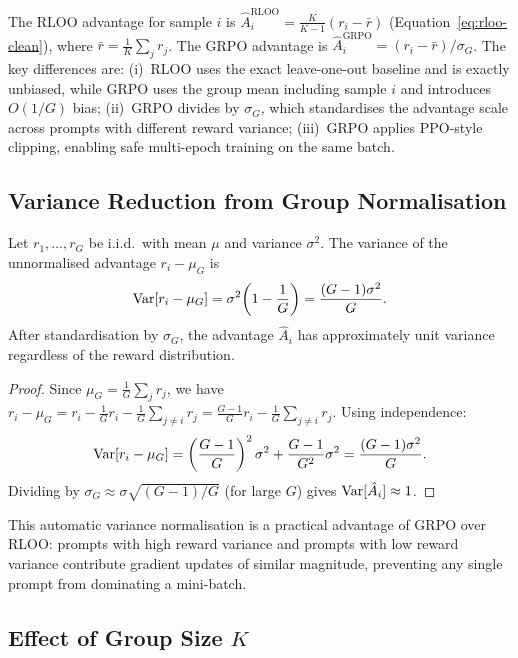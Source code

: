 The RLOO advantage for sample $i$ is $\hat{A}_i^{\mathrm{RLOO}} = \frac{K}{K-1}(r_i - \bar{r})$ (Equation~\eqref{eq:rloo-clean}), where $\bar{r} = \frac{1}{K}\sum_j r_j$.  The GRPO advantage is $\hat{A}_i^{\mathrm{GRPO}} = (r_i - \bar{r}) / \sigma_G$.  The key differences are: (i)~RLOO uses the exact leave-one-out baseline and is exactly unbiased, while GRPO uses the group mean including sample $i$ and introduces $O(1/G)$ bias; (ii)~GRPO divides by $\sigma_G$, which standardises the advantage scale across prompts with different reward variance; (iii)~GRPO applies PPO-style clipping, enabling safe multi-epoch training on the same batch.

\subsection{Variance Reduction from Group Normalisation}

\begin{proposition}
\label{prop:grpo-variance}
Let $r_1, \ldots, r_G$ be i.i.d.\ with mean $\mu$ and variance $\sigma^2$.  The variance of the unnormalised advantage $r_i - \mu_G$ is
\begin{equation}
\label{eq:grpo-var-unnorm}
\operatorname{Var}[r_i - \mu_G] = \sigma^2\!\left(1 - \frac{1}{G}\right) = \frac{(G-1)\sigma^2}{G}.
\end{equation}
After standardisation by $\sigma_G$, the advantage $\hat{A}_i$ has approximately unit variance regardless of the reward distribution.
\end{proposition}

\begin{proof}
Since $\mu_G = \frac{1}{G}\sum_j r_j$, we have $r_i - \mu_G = r_i - \frac{1}{G}r_i - \frac{1}{G}\sum_{j \neq i} r_j = \frac{G-1}{G}r_i - \frac{1}{G}\sum_{j \neq i} r_j$.  Using independence:
\[
\operatorname{Var}[r_i - \mu_G] = \left(\frac{G-1}{G}\right)^2 \sigma^2 + \frac{G-1}{G^2}\sigma^2 = \frac{(G-1)\sigma^2}{G}.
\]
Dividing by $\sigma_G \approx \sigma\sqrt{(G-1)/G}$ (for large $G$) gives $\operatorname{Var}[\hat{A}_i] \approx 1$.
\end{proof}

This automatic variance normalisation is a practical advantage of GRPO over RLOO: prompts with high reward variance and prompts with low reward variance contribute gradient updates of similar magnitude, preventing any single prompt from dominating a mini-batch.

\subsection{Effect of Group Size $K$}


